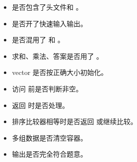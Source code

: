 \begin{itemize}
  \item 是否包含了头文件和 。
  \item 是否开了快速输入输出。
  \item 是否混用了  和 。
  \item 求和、乘法、答案是否用了 。
  \item vector 是否按正确大小初始化。
  \item 访问  前是否判断非空。
  \item {} 返回  时是否处理。
  \item 排序比较器相等时是否返回  或继续比较。
  \item 多组数据是否清空容器。
  \item 输出是否完全符合题意。
\end{itemize}
